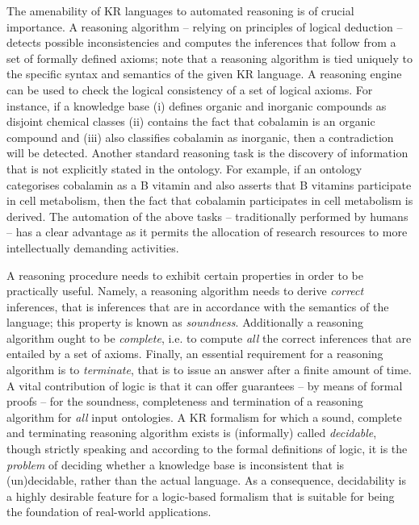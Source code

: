 \documentclass[10pt]{bmc_article}
\newenvironment{bmcformat}{\baselineskip20pt\sloppy\setboolean{publ}{false}}{\baselineskip20pt\sloppy}
\begin{document}
\begin{bmcformat}
The amenability of KR languages to automated reasoning is of crucial importance. A reasoning algorithm -- relying on principles of logical deduction -- detects possible inconsistencies and computes the inferences that follow from a set of formally defined axioms; note that a reasoning algorithm is tied uniquely to the specific syntax and semantics of the given KR language. A reasoning engine can be used to check the logical consistency of a set of logical axioms. For instance, if a knowledge base (i) defines organic and inorganic compounds as disjoint chemical classes (ii) contains the fact that cobalamin is an organic compound and (iii) also classifies cobalamin as inorganic, then a contradiction will be detected. Another standard reasoning task is the discovery of information that is not explicitly stated in the ontology. For example, if an ontology categorises cobalamin as a B vitamin and also asserts that B vitamins participate in cell metabolism, then the fact that cobalamin participates in cell metabolism is derived. The automation of the above tasks -- traditionally performed by humans -- has a clear advantage as it permits the allocation of research resources to more intellectually demanding activities.

A reasoning procedure needs to exhibit certain properties in order to be practically useful. Namely, a reasoning algorithm needs to derive \emph{correct} inferences, that is inferences that are in accordance with the semantics of the language; this property is known as \emph{soundness}. Additionally a reasoning algorithm ought to be \emph{complete}, i.e. to compute \emph{all} the correct inferences that are entailed by a set of axioms. Finally, an essential requirement for a reasoning algorithm is to \emph{terminate}, that is to issue an answer after a finite amount of time. A vital contribution of logic is that it can offer guarantees -- by means of formal proofs -- for the soundness, completeness and termination of a reasoning algorithm for \emph{all} input ontologies. A KR formalism for which a sound, complete and terminating reasoning algorithm exists is (informally) called \emph{decidable}, though strictly speaking and according to the formal definitions of logic, it is the \emph{problem} of deciding whether a knowledge base is inconsistent that is (un)decidable, rather than the actual language. As a consequence, decidability is a highly desirable feature for a logic-based formalism that is suitable for being the foundation of real-world applications.


\end{bmcformat}
\end{document}

